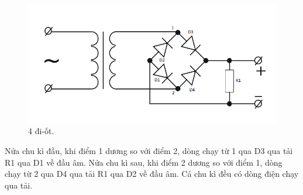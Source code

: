 \documentclass[a4paper,12pt,oneside]{article}
\begin{document}
\begin{itemize}
\begin{figure}[H]
\centering
\begin{center}
\includegraphics[scale=.6]{hinh/PPM/ppm_4diode.png}
\end{center}
\caption{4 đi-ốt.}
\end{figure}
Nửa chu kì đầu, khi điểm 1 dương so với điểm 2, dòng chạy từ 1 qua D3 qua tải R1 qua D1 về đầu âm. Nửa chu kì sau, khi điểm 2 dương so với điểm 1, dòng chạy từ 2 qua D4 qua tải R1 qua D2 về đầu âm. Cả chu kì đều có dòng điện chạy qua tải.
\end{itemize}
\end{document}

